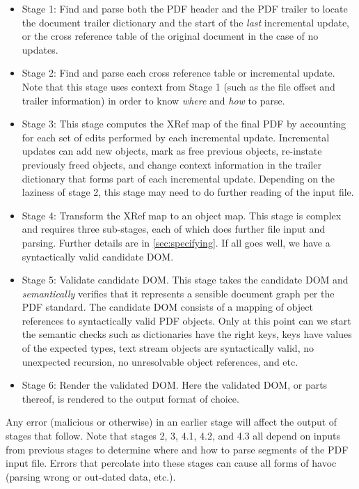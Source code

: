 \begin{itemize}
\item Stage 1: Find and parse both the PDF header and the PDF trailer to locate
  the document trailer dictionary and the start of the \emph{last} incremental update, or
  the cross reference table of the original document in the case of no updates.
\item Stage 2: Find and parse each cross reference table or incremental update. 
  Note that this stage uses context from Stage 1 (such as the file offset and trailer
  information) in order to know \emph{where} and \emph{how} to parse.
\item Stage 3: This stage computes the
   XRef map of the final PDF by accounting for each set of edits performed by each incremental update.
   Incremental updates can add new objects, mark as free previous objects, re-instate previously 
   freed objects, and change context information in the trailer dictionary that 
   forms part of each incremental update.
   Depending on the laziness of stage 2, this stage may need to do further
   reading of the input file.
\item Stage 4: Transform the XRef map to an object map. This stage is complex and
  requires three sub-stages, each of which does further file input and parsing.
  Further details are in \cref{sec:specifying}.
  If all goes well, we have a syntactically valid candidate DOM.
\item Stage 5: Validate candidate DOM.  This stage takes the candidate DOM and
  \emph{semantically} verifies that it represents a sensible document graph per
  the PDF standard.
  The candidate DOM consists of a mapping of object references to
  syntactically valid PDF objects.  
  Only at this point can we start the semantic checks such as
  dictionaries have the right keys,
  keys have values of the expected types,
  text stream objects are syntactically valid,
  no unexpected recursion, no unresolvable object references,
  and etc.
\item Stage 6: Render the validated DOM. Here the validated DOM, or parts thereof, is rendered
  to the output format of choice.
\end{itemize}

Any error (malicious or otherwise) in an earlier stage will affect the output of stages that follow.
Note that stages 2, 3, 4.1, 4.2, and 4.3 all depend on inputs from previous stages to determine 
where and how to parse segments of the PDF input file.
Errors that percolate into these stages can
cause all forms of havoc (parsing wrong or out-dated data, etc.).

